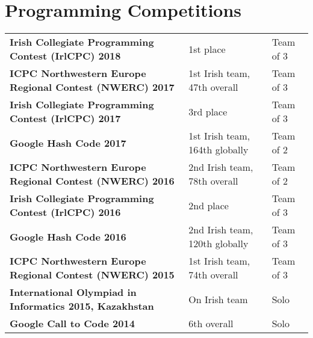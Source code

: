 \documentclass[a4paper, oneside, final]{scrartcl}
\newcommand{\fmtcompetition}[1]{\textbf{#1}}
\begin{document}
\section{Programming Competitions}
\begin{tabularx}{\columnwidth}{@{}XTP@{}}
\fmtcompetition{Irish Collegiate Programming Contest (IrlCPC) 2018}&1st place&Team of 3\\
\fmtcompetition{ICPC Northwestern Europe Regional Contest (NWERC) 2017}&1st Irish team, 47th overall&Team of 3\\
\fmtcompetition{Irish Collegiate Programming Contest (IrlCPC) 2017}&3rd place&Team of 3\\
\fmtcompetition{Google Hash Code 2017}&1st Irish team, 164th globally&Team of 2\\
\fmtcompetition{ICPC Northwestern Europe Regional Contest (NWERC) 2016}&2nd Irish team, 78th overall&Team of 2\\
\fmtcompetition{Irish Collegiate Programming Contest (IrlCPC) 2016}&2nd place&Team of 3\\
\fmtcompetition{Google Hash Code 2016}&2nd Irish team, 120th globally&Team of 3\\
\fmtcompetition{ICPC Northwestern Europe Regional Contest (NWERC) 2015}&1st Irish team, 74th overall&Team of 3\\
\fmtcompetition{International Olympiad in Informatics 2015, Kazakhstan}&On Irish team&Solo\\
\fmtcompetition{Google Call to Code 2014}&6th overall&Solo
\end{tabularx}
\end{document}
